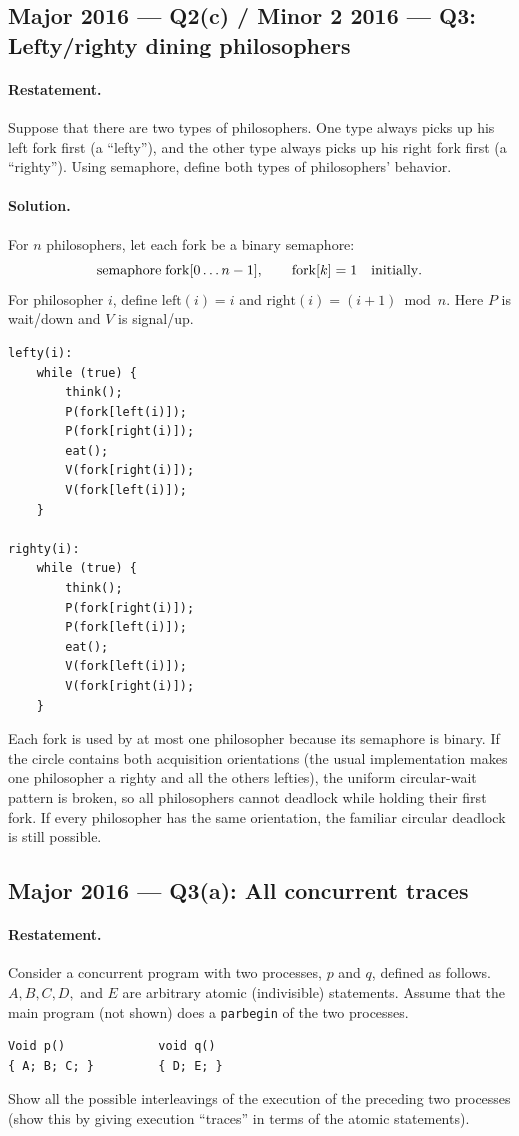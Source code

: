 \documentclass[11pt,a4paper]{article}
\begin{document}
\subsection*{Major 2016 --- Q2(c) / Minor 2 2016 --- Q3: Lefty/righty dining philosophers}
\paragraph{Restatement.}
Suppose that there are two types of philosophers.  One type always
picks up his left fork first (a ``lefty''), and the other type always
picks up his right fork first (a ``righty'').  Using semaphore, define
both types of philosophers' behavior.

\paragraph{Solution.}
For \(n\) philosophers, let each fork be a binary semaphore:
\[
\mathrm{semaphore}\;\mathrm{fork}[0\ldots n-1],
\qquad \mathrm{fork}[k]=1\quad\hbox{initially}.
\]
For philosopher \(i\), define
\(\mathrm{left}(i)=i\) and
\(\mathrm{right}(i)=(i+1)\bmod n\).  Here \(P\) is wait/down and \(V\)
is signal/up.

\begin{verbatim}
lefty(i):
    while (true) {
        think();
        P(fork[left(i)]);
        P(fork[right(i)]);
        eat();
        V(fork[right(i)]);
        V(fork[left(i)]);
    }

righty(i):
    while (true) {
        think();
        P(fork[right(i)]);
        P(fork[left(i)]);
        eat();
        V(fork[left(i)]);
        V(fork[right(i)]);
    }
\end{verbatim}

Each fork is used by at most one philosopher because its semaphore is
binary.  If the circle contains both acquisition orientations (the
usual implementation makes one philosopher a righty and all the
others lefties), the uniform circular-wait pattern is broken, so all
philosophers cannot deadlock while holding their first fork.  If every
philosopher has the same orientation, the familiar circular deadlock
is still possible.

\subsection*{Major 2016 --- Q3(a): All concurrent traces}

\paragraph{Restatement.}
Consider a concurrent program with two processes, \(p\) and \(q\),
defined as follows.  \(A,B,C,D,\) and \(E\) are arbitrary atomic
(indivisible) statements.  Assume that the main program (not shown)
does a \texttt{parbegin} of the two processes.
\begin{verbatim}
Void p()             void q()
{ A; B; C; }         { D; E; }
\end{verbatim}
Show all the possible interleavings of the execution of the preceding
two processes (show this by giving execution ``traces'' in terms of the
atomic statements).
\end{document}
